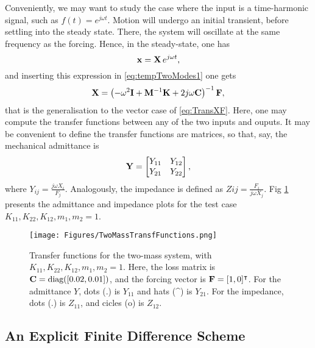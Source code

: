 \documentclass[11pt,twoside,a4paper,english]{book}
\begin{document}
Conveniently, we may want to study the case where the input is a time-harmonic signal, such as $f(t) = e^{j\omega t}$. Motion will undergo an initial transient, before settling into the steady state. There, the system will oscillate at the same frequency as the forcing. Hence, in the steady-state, one has
\begin{equation}
{\bf x} = {\bf X}\, e^{j\omega t},
\end{equation}
and inserting this expression in \eqref{eq:tempTwoModes1} one gets
\begin{equation}
{\bf X} = \left( -\omega^2 {\bf I} + {\bf M}^{-1}{\bf K} + 2 j \omega {\bf C} \right)^{-1}{\bf F},
\end{equation}
that is the generalisation to the vector case of \eqref{eq:TransXF}. Here, one may compute the transfer functions between any of the two inputs and ouputs. It may be convenient to define the transfer functions are matrices, so that, say, the mechanical admittance is
\begin{equation}
{\bf Y} = \begin{bmatrix} Y_{11} & Y_{12} \\ Y_{21} & Y_{22} \end{bmatrix},
\end{equation}
where $Y_{ij} = \frac{j \omega X_i}{ F_j}$. Analogously, the impedance is defined as $Zij = \frac{F_i}{j \omega X_j}$. Fig \ref{fig:TransFunctionsTwoMass} presents the admittance and impedance plots for the test case $K_{11},K_{22},K_{12},m_1,m_2=1$.



\begin{figure}[hbt]
\centering
\texttt{[image: Figures/TwoMassTransfFunctions.png]}
\caption{Transfer functions for the two-mass system, with $K_{11},K_{22},K_{12},m_1,m_2=1$. Here, the loss matrix is ${\bf C} = \text{diag}([0.02,0.01])$, and the forcing vector is ${\bf F} = [1,0]^\intercal$. For the admittance $Y$, dots (.) is $Y_{11}$ and hats (\^{}) is $Y_{21}$. For the impedance, dots (.) is $Z_{11}$, and cicles (o) is $Z_{12}$. }\label{fig:TransFunctionsTwoMass}
\end{figure}

\subsection{An Explicit Finite Difference Scheme}
\end{document}
